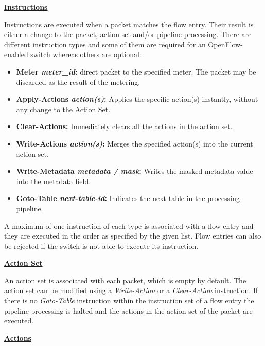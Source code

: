 \underline{\textbf{Instructions}}

Instructions are executed when a packet matches the flow entry. Their result is either a change to the packet, action set and/or pipeline processing. There are different instruction types and some of them are required for an OpenFlow-enabled switch whereas others are optional:

\begin{itemize}
\item \textbf{Meter \textit{meter\_id}:} direct packet to the specified meter. The packet may be discarded as the result of the metering.
\item \textbf{Apply-Actions \textit{action(s)}:} Applies the specific action(s) instantly, without any change to the Action Set.
\item \textbf{Clear-Actions:} Immediately clears all the actions in the action set.
\item \textbf{Write-Actions \textit{action(s)}:} Merges the specified action(s) into the current action set.
\item \textbf{Write-Metadata \textit{metadata / mask}:} Writes the masked metadata value into the metadata field.
\item \textbf{Goto-Table \textit{next-table-id}:} Indicates the next table in the processing pipeline.
\end{itemize}

A maximum of one instruction of each type is associated with a flow entry and they are executed in the order as specified by the given list. Flow entries can also be rejected if the switch is not able to execute its instruction.


\underline{\textbf{Action Set}}

An action set is associated with each packet, which is empty by default. The action set can be modified using a \textit{Write-Action} or a \textit{Clear-Action} instruction. If there is no \textit{Goto-Table} instruction within the instruction set of a flow entry the pipeline processing is halted and the actions in the action set of the packet are executed.


\underline{\textbf{Actions}}

